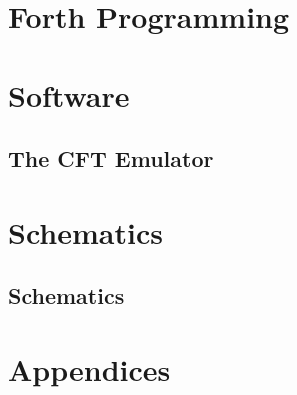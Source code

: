 \ifdefined\renderpartforth
\part{Forth Programming}
  \glsresetall


\fi



\ifdefined\renderpartsoftware
\part{Software}
  \glsresetall

\ifdefined\renderchapfs

\fi

\ifdefined\renderchapemulators
  \chapter{The CFT Emulator}
  \glsresetall
  \label{chap:emulator}
  
\fi
\fi


\ifdefined\renderpartschematics
\part{Schematics}

\chapter{Schematics}
\glsresetall
 
\fi


\ifdefined\renderpartbackmatter
  \appendix
  \part{Appendices}

  \backmatter
  \renewcommand{\thepage}{\roman{page}}

  \glsaddall
  \printglossaries

  \printindex
\fi


